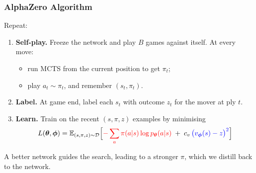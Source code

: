 \begin{frame}
    \frametitle{AlphaZero Algorithm}
    Repeat:
    \begin{enumerate}
        \item \textbf{Self-play.} Freeze the network and play $B$ games against itself. At every move:
        \begin{itemize}
            \item run MCTS from the current position to get $\pi_t$;
            \item play $a_t \sim \pi_t$, and remember $(s_t, \pi_t)$.
        \end{itemize}
        \vspace{0.1cm}
        \item \textbf{Label.} At game end, label each $s_t$ with outcome $z_t$ for the mover at ply $t$.
        \vspace{0.1cm}
        \item \textbf{Learn.} Train on the recent $(s, \pi, z)$ examples by minimising 
        $$
        L({\boldsymbol{\theta}}, {\boldsymbol{\phi}}) = \mathbb{E}_{(s, \pi, z) \sim \mathcal{D}}\Big[
        \textcolor{red}{-\sum_a \pi(a|s) \log p_{\boldsymbol{\theta}}(a|s)}
        \;+\; c_v \, \textcolor{blue}{\big(v_{\boldsymbol{\phi}}(s) - z\big)^2}
        \Big]
        $$
    \end{enumerate}
    \vspace{0.3cm}
    A better network guides the search, leading to a stronger $\pi$, which we distill back to the network.
\end{frame}




